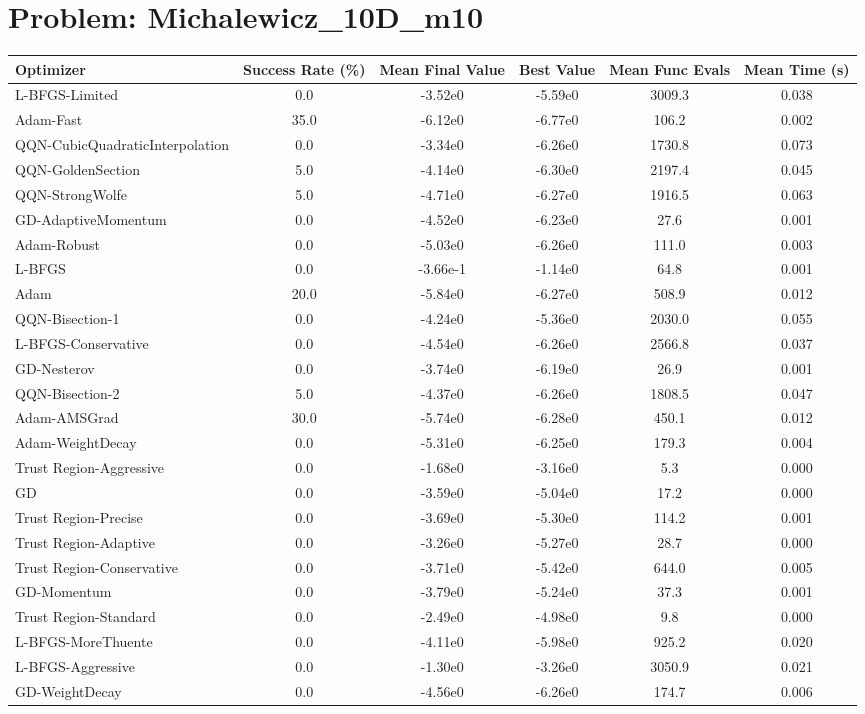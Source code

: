 \documentclass{article}
\begin{document}
\section{Problem: Michalewicz\_10D\_m10}
\begin{longtable}{p{3cm}*{5}{c}}
\toprule
\textbf{Optimizer} & \textbf{Success Rate (\%)} & \textbf{Mean Final Value} & \textbf{Best Value} & \textbf{Mean Func Evals} & \textbf{Mean Time (s)} \\
\midrule
L-BFGS-Limited & 0.0 & -3.52e0 & -5.59e0 & 3009.3 & 0.038 \\
Adam-Fast & 35.0 & -6.12e0 & -6.77e0 & 106.2 & 0.002 \\
QQN-CubicQuadraticInterpolation & 0.0 & -3.34e0 & -6.26e0 & 1730.8 & 0.073 \\
QQN-GoldenSection & 5.0 & -4.14e0 & -6.30e0 & 2197.4 & 0.045 \\
QQN-StrongWolfe & 5.0 & -4.71e0 & -6.27e0 & 1916.5 & 0.063 \\
GD-AdaptiveMomentum & 0.0 & -4.52e0 & -6.23e0 & 27.6 & 0.001 \\
Adam-Robust & 0.0 & -5.03e0 & -6.26e0 & 111.0 & 0.003 \\
L-BFGS & 0.0 & -3.66e-1 & -1.14e0 & 64.8 & 0.001 \\
Adam & 20.0 & -5.84e0 & -6.27e0 & 508.9 & 0.012 \\
QQN-Bisection-1 & 0.0 & -4.24e0 & -5.36e0 & 2030.0 & 0.055 \\
L-BFGS-Conservative & 0.0 & -4.54e0 & -6.26e0 & 2566.8 & 0.037 \\
GD-Nesterov & 0.0 & -3.74e0 & -6.19e0 & 26.9 & 0.001 \\
QQN-Bisection-2 & 5.0 & -4.37e0 & -6.26e0 & 1808.5 & 0.047 \\
Adam-AMSGrad & 30.0 & -5.74e0 & -6.28e0 & 450.1 & 0.012 \\
Adam-WeightDecay & 0.0 & -5.31e0 & -6.25e0 & 179.3 & 0.004 \\
Trust Region-Aggressive & 0.0 & -1.68e0 & -3.16e0 & 5.3 & 0.000 \\
GD & 0.0 & -3.59e0 & -5.04e0 & 17.2 & 0.000 \\
Trust Region-Precise & 0.0 & -3.69e0 & -5.30e0 & 114.2 & 0.001 \\
Trust Region-Adaptive & 0.0 & -3.26e0 & -5.27e0 & 28.7 & 0.000 \\
Trust Region-Conservative & 0.0 & -3.71e0 & -5.42e0 & 644.0 & 0.005 \\
GD-Momentum & 0.0 & -3.79e0 & -5.24e0 & 37.3 & 0.001 \\
Trust Region-Standard & 0.0 & -2.49e0 & -4.98e0 & 9.8 & 0.000 \\
L-BFGS-MoreThuente & 0.0 & -4.11e0 & -5.98e0 & 925.2 & 0.020 \\
L-BFGS-Aggressive & 0.0 & -1.30e0 & -3.26e0 & 3050.9 & 0.021 \\
GD-WeightDecay & 0.0 & -4.56e0 & -6.26e0 & 174.7 & 0.006 \\
\bottomrule
\end{longtable}
\end{document}
